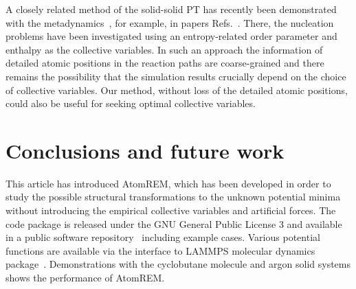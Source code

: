 \documentclass[preprint,12pt]{elsarticle}
\begin{document}


A closely related method of the solid-solid PT has recently been demonstrated with the metadynamics~\cite{Laio01102002}, for example, in papers Refs.~\cite{PhysRevLett.119.015701, Meta_dynamics_nucl}. There, the nucleation problems have been investigated using an entropy-related order parameter and enthalpy as the collective variables. In such an approach the information of detailed atomic positions in the reaction paths are coarse-grained and there remains the possibility that the simulation results crucially depend on the choice of collective variables. Our method, without loss of the detailed atomic positions, could also be useful for seeking optimal collective variables.


\section{Conclusions and future work}
\label{sec:conclusion}
This article has introduced AtomREM, which has been developed in order to study the possible structural transformations to the unknown potential minima without introducing the empirical collective variables and artificial forces. The code package is released under the GNU General Public License 3 and available in a public software repository~\cite{AtomREM} including example cases. Various potential functions are available via the interface to LAMMPS molecular dynamics package~\cite{LAMMPS}. Demonstrations with the cyclobutane molecule and argon solid systems shows the performance of AtomREM. %
\end{document}
